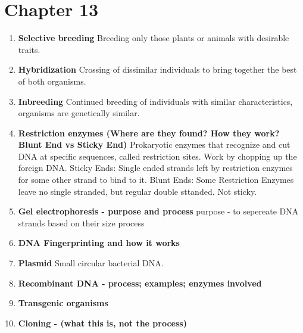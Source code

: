 \documentclass[9pt]{article}
\begin{document}
\section*{Chapter 13}
\begin{enumerate}
  \item {\bf Selective breeding} Breeding only those plants or animals
    with desirable traits.
  \item {\bf Hybridization} Crossing of dissimilar individuals to
    bring together the best of both organisms.
  \item {\bf Inbreeding} Continued breeding of individuals with
    similar characteristics, organisms are genetically similar.
  \item {\bf Restriction enzymes (Where are they found? How they work?
    Blunt End vs Sticky End)} Prokaryotic enzymes that recognize and
    cut DNA at specific sequences, called restriction sites. Work by
    chopping up the foreign DNA. Sticky Ends: Single ended strands
    left by restriction enzymes for some other strand to bind to
    it. Blunt Ends: Some Restriction Enzymes leave no single stranded,
    but regular double sttanded. Not sticky.
  \item {\bf Gel electrophoresis  -  purpose and process}
  purpose - to sepereate DNA strands based on their size
  process
  \item {\bf DNA Fingerprinting and how it works}
  \item {\bf Plasmid} Small circular bacterial DNA.
  \item {\bf Recombinant DNA  -  process; examples; enzymes involved}
  \item {\bf Transgenic organisms}
  \item {\bf Cloning  -  (what this is, not the process)}
\end{enumerate}
\end{document}

